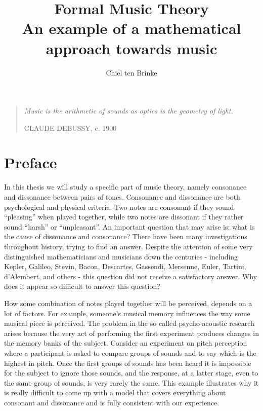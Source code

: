 \documentclass[a4paper]{book}
\title{Formal Music Theory \\ \small{An example of a mathematical approach towards music}}
\author{Chiel ten Brinke}
\theoremstyle{definition}
\begin{document}
\maketitle

\vspace*{\fill}
\thispagestyle{empty} %
\begin{quotation}
    \em %
    \Large{Music is the arithmetic of sounds as optics is the geometry of light.}

    \medskip
    \raggedleft
    CLAUDE DEBUSSY, c. 1900
\end{quotation}
\vspace*{\fill}

\tableofcontents

\chapter*{Preface}
In this thesis we will study a specific part of music theory, namely consonance and dissonance between pairs of tones.
Consonance and dissonance are both psychological and physical criteria. 
Two notes are consonant if they sound ``pleasing'' when played together, while two notes are dissonant if they rather sound ``harsh'' or ``unpleasant''.
An important question that may arise is: what is the cause of dissonance and consonance?
There have been many investigations throughout history, trying to find an answer.
Despite the attention of some very distinguished mathematicians and musicians down the centuries - including Kepler, Galileo, Stevin, Bacon, Descartes, Gassendi, Mersenne, Euler, Tartini, d'Alembert, and others - this question did not receive a satisfactory answer. \cite{DavidFowler}
Why does it appear so difficult to answer this question?

How some combination of notes played together will be perceived, depends on a lot of factors.
For example, someone's musical memory influences the way some musical piece is perceived.
The problem in the so called psycho-acoustic research arises because the very act of performing the first experiment produces changes in the memory banks of the subject.
Consider an experiment on pitch perception where a participant is asked to compare groups of sounds and to say which is the highest in pitch. 
Once the first groups of sounds has been heard it is impossible for the subject to ignore those sounds, and the response, at a latter stage, even to the same group of sounds, is very rarely the same. \cite{CharlesTaylor}
This example illustrates why it is really difficult to come up with a model that covers everything about consonant and dissonance and is fully consistent with our experience.
\end{document}
